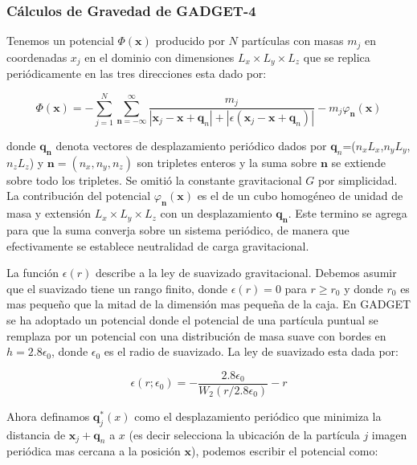\subsubsection{Cálculos de Gravedad de GADGET-4}

Tenemos un potencial $\Phi (\mathbf{x})$ producido por $N$ partículas con masas $m_j$ en coordenadas $x_j$ en el dominio con dimensiones $L_x \times L_y \times L_z$ que se replica periódicamente en las tres direcciones esta dado por:

\begin{equation}
    \Phi (\mathbf{x}) = - \sum_{j=1}^{N} \sum_{\mathbf{n}=-\infty}^{\infty}  \frac{ m_j }{ |\mathbf{x}_j - \mathbf{x} + \mathbf{q}_n| + |\epsilon ( \mathbf{x}_j - \mathbf{x} + \mathbf{q}_n)| }   - m_j\varphi_{\mathbf{n}}(\mathbf{x})
    \label{eq:Grav_Pot_1}
\end{equation}

\noindent donde $\mathbf{q_n}$ denota vectores de desplazamiento periódico dados por $\mathbf{q}_n$=($n_x$$L_x$,$ n_y$$L_y$,$n_z$$L_z$) y $\mathbf{n} = (n_x, n_y, n_z)$ son tripletes enteros y la suma sobre $\mathbf{n}$ se extiende sobre todo los tripletes. Se omitió la constante gravitacional $G$ por simplicidad. La contribución del potencial $\varphi_{\mathbf{n}}(\mathbf{x})$ es el de un cubo homogéneo de unidad de masa y extensión $L_x \times L_y \times L_z$ con un desplazamiento $\mathbf{q_n}$. Este termino se agrega para que la suma converja sobre un sistema periódico, de manera que efectivamente se establece neutralidad de carga gravitacional.

La función $\epsilon(r)$ describe a la ley de suavizado gravitacional. Debemos asumir que el suavizado tiene un rango finito, donde $\epsilon(r)=0$ para $r\geq r_0$ y donde $r_0$ es mas pequeño que la mitad de la dimensión mas pequeña de la caja. En GADGET se ha adoptado un potencial donde el potencial de una partícula puntual se remplaza por un potencial con una distribución de masa suave con bordes en $h=2.8\epsilon_0$, donde $\epsilon_0$ es el radio de suavizado. La ley de suavizado esta dada por:

\begin{equation}
    \epsilon(r;\epsilon_0) = - \frac{2.8\epsilon_0}{W_2(r/2.8\epsilon_0)} -r
    \label{eq:Ley-Suavizado}
\end{equation}

Ahora definamos $\mathbf{q}^*_j(x)$ como el desplazamiento periódico que minimiza la distancia de $\mathbf{x}_j+\mathbf{q}_n$ a $x$ (es decir selecciona la ubicación de la partícula $j$ imagen periódica mas cercana a la posición $\mathbf{x}$), podemos escribir el potencial como:

